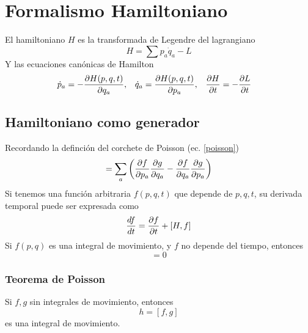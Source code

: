 \documentclass[]{article}
\numberwithin{equation}{section}
\begin{document}
\section{Formalismo Hamiltoniano}
El hamiltoniano $H$ es la transformada de Legendre del lagrangiano
\begin{equation}
	H = \sum p_a \dot{q}_a - L
\end{equation}
Y las ecuaciones canónicas de Hamilton
\begin{align}
	\dot{p}_a &= - \dfrac{\partial H(p,q,t)}{\partial q_a}, & \dot{q}_a &= \dfrac{\partial H(p,q,t)}{\partial p_a}, & \dfrac{\partial H}{\partial t} &= - \dfrac{\partial L}{\partial t}
\end{align}

\subsection{Hamiltoniano como generador}
Recordando la definción del corchete de Poisson (ec. \ref{poisson})
\begin{equation*}
	[f, g] = \sum_{a} \left( \pd{f}{p_a}\pd{g}{q_a} - \pd{f}{q_a}\pd{g}{p_a} \right)
\end{equation*}
Si tenemos una función arbitraria $f(p,q,t)$ que depende de $p,q,t$, su derivada temporal puede ser expresada como
\begin{equation}
	\dfrac{d f}{d t} = \dfrac{\partial f}{\partial t} + [H,f]
\end{equation} 
Si $f(p,q)$ es una integral de movimiento, y $f$ no depende del tiempo, entonces
\begin{equation}
	[H,f] = 0
\end{equation}

\subsubsection{Teorema de Poisson}
Si $f,g$ sin integrales de movimiento, entonces
\begin{equation}
	h = [f,g]
\end{equation}
es una integral de movimiento.
\end{document}
